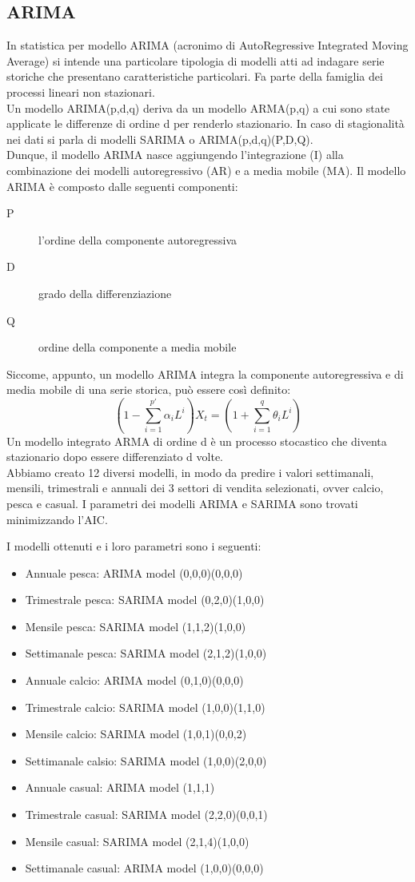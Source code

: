 \documentclass[12pt, a4paper, twocolumn]{article} %
\begin{document}
\subsection{ARIMA}
In statistica per modello ARIMA (acronimo di AutoRegressive Integrated Moving Average) si intende una particolare tipologia di modelli atti ad indagare serie storiche che presentano caratteristiche particolari. Fa parte della famiglia dei processi lineari non stazionari.\\
Un modello ARIMA(p,d,q) deriva da un modello ARMA(p,q) a cui sono state applicate le differenze di ordine d per renderlo stazionario. In caso di stagionalità nei dati si parla di modelli SARIMA o ARIMA(p,d,q)(P,D,Q).\\
Dunque, il modello ARIMA nasce aggiungendo l'integrazione (I) alla combinazione dei modelli autoregressivo (AR) e a media mobile (MA). Il modello ARIMA è composto dalle seguenti componenti:
\begin{description}
	\item[P] l'ordine della componente autoregressiva
	\item[D] grado della differenziazione
	\item[Q] ordine della componente a media mobile
\end{description}
Siccome, appunto, un modello ARIMA integra la componente autoregressiva e di media mobile di una serie storica, può essere così definito:
\[
(1 - \sum_{i=1}^{p'}\alpha_iL^i)X_t = (1+\sum_{i=1}^{q}\theta_iL^i)	
\]
 Un modello integrato ARMA di ordine d è un processo stocastico che diventa stazionario dopo essere differenziato d volte.\\

Abbiamo creato 12 diversi modelli, in modo da predire i valori settimanali, mensili, trimestrali e annuali dei 3 settori di vendita selezionati, ovver calcio, pesca e casual. I parametri dei modelli ARIMA e SARIMA sono trovati minimizzando l'AIC.

I modelli ottenuti e i loro parametri sono i seguenti:
\begin{itemize}
	\item Annuale pesca: ARIMA model (0,0,0)(0,0,0)
	\item Trimestrale pesca: SARIMA model (0,2,0)(1,0,0)
	\item Mensile pesca: SARIMA model (1,1,2)(1,0,0)
	\item Settimanale pesca: SARIMA model (2,1,2)(1,0,0)
	\item Annuale calcio: ARIMA model (0,1,0)(0,0,0)
	\item  Trimestrale calcio: SARIMA model (1,0,0)(1,1,0)
	\item Mensile calcio: SARIMA model (1,0,1)(0,0,2)
	\item Settimanale calsio: SARIMA model (1,0,0)(2,0,0)
	\item Annuale casual: ARIMA model (1,1,1)
	\item Trimestrale casual: SARIMA model (2,2,0)(0,0,1)
	\item Mensile casual: SARIMA model (2,1,4)(1,0,0)
	\item Settimanale casual: ARIMA model (1,0,0)(0,0,0)
\end{itemize}
\end{document}
